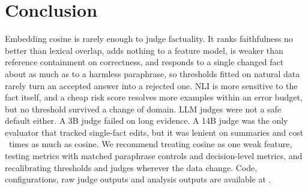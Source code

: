 

\section{Conclusion}
\label{sec:conclusion}

Embedding cosine is rarely enough to judge factuality. It ranks faithfulness no better than lexical overlap, adds nothing to a feature model, is weaker than reference containment on correctness, and responds to a single changed fact about as much as to a harmless paraphrase, so thresholds fitted on natural data rarely turn an accepted answer into a rejected one. NLI is more sensitive to the fact itself, and a cheap risk score resolves more examples within an error budget, but no threshold survived a change of domain. LLM judges were not a safe default either. A 3B judge failed on long evidence. A 14B judge was the only evaluator that tracked single-fact edits, but it was lenient on summaries and cost \CostJudgeStrongRatio\ times as much as cosine. We recommend treating cosine as one weak feature, testing metrics with matched paraphrase controls and decision-level metrics, and recalibrating thresholds and judges wherever the data change. Code, configurations, raw judge outputs and analysis outputs are available at \CodeURL.
